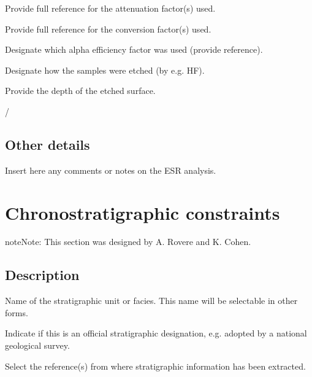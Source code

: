 \documentclass[letterpaper,10pt,english]{sphinxmanual}
\begin{document}
 \sphinxhyphen{} Provide full reference for the attenuation factor(s) used.

 \sphinxhyphen{} Provide full reference for the conversion factor(s) used.

 \sphinxhyphen{} Designate which alpha efficiency factor was used (provide reference).

 \sphinxhyphen{} Designate how the samples were etched (by e.g. HF).

 \sphinxhyphen{} Provide the depth of the etched surface.


 / 


\section{Other details}
\label{\detokenize{ESR:other-details}}
 \sphinxhyphen{} Insert here any comments or notes on the ESR analysis.


\chapter{Chronostratigraphic constraints}
\label{\detokenize{Chronostratigraphy:chronostratigraphic-constraints}}\label{\detokenize{Chronostratigraphy::doc}}
\begin{sphinxadmonition}{note}{Note:}
This section was designed by A. Rovere and K. Cohen.
\end{sphinxadmonition}


\section{Description}
\label{\detokenize{Chronostratigraphy:description}}
 \sphinxhyphen{} Name of the stratigraphic unit or facies. This name will be selectable in other forms.

 \sphinxhyphen{} Indicate if this is an official stratigraphic designation, e.g. adopted by a national geological survey.

\sphinxhyphen{} Select the reference(s) from where stratigraphic information has been extracted.
\end{document}
